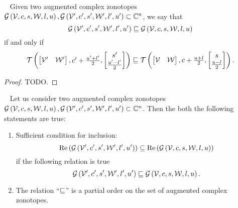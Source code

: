 \begin{definition}~\label{defn:inclusion-acz}
Given two augmented complex zonotopes $\mathcal{G}\left(\mathcal{V},c,s,\mathcal{W},l,u\right),
\mathcal{G}\left(\mathcal{V}^\prime,c^\prime,s^\prime,\mathcal{W}^\prime,l^\prime,u^\prime\right)\subset\mathbb{C}^n$,
we say that
%
\[
\mathcal{G}\left(\mathcal{V}^\prime,c^\prime,s^\prime,\mathcal{W}^\prime,l^\prime,u^\prime\right) \sqsubseteq
 \mathcal{G}\left(\mathcal{V},c,s,\mathcal{W},l,u\right)
\]
%
if and only if
%
\[
\mathit{\operatorname{\mathcal{T}}}\left(\left[\begin{matrix}
      \mathcal{V}^\prime &
      \mathcal{W}^\prime
    \end{matrix}\right]
  ,\begin{matrix}
      c^\prime+\frac{u^\prime+l^\prime}{2}
    \end{matrix}
  ,\left[\begin{matrix}
      s^\prime\\
      \frac{u^\prime-l^\prime}{2}
    \end{matrix}\right]
  \right)  
  \sqsubseteq
  \mathit{\operatorname{\mathcal{T}}}\left(\left[\begin{matrix}
      \mathcal{V} &
      \mathcal{W}
    \end{matrix}\right]
  ,\begin{matrix}
      c+\frac{u+l}{2}
    \end{matrix}
  ,\left[\begin{matrix}
      s\\
      \frac{u-l}{2}
    \end{matrix}\right]
  \right).
\]
%
\end{definition}
%
\begin{proof}
{\color{red} TODO}.
\end{proof}
%
\begin{theorem}~\label{thm:acz-inclusion}
Let us consider two augmented complex zonotopes $\mathcal{G}\left(\mathcal{V},c,s,\mathcal{W},l,u\right),
\mathcal{G}\left(\mathcal{V}^\prime,c^\prime,s^\prime,\mathcal{W}^\prime,l^\prime,u^\prime\right)\subset\mathbb{C}^n$.
Then the both the following statements are true:
\begin{enumerate}
  \item Sufficient condition for inclusion:
%
\[
\operatorname{Re}\left(\mathcal{G}\left(\mathcal{V}^\prime,c^\prime,s^\prime,\mathcal{W}^\prime,l^\prime,u^\prime\right)\right)\subseteq\operatorname{Re}\left(\mathcal{G}\left(\mathcal{V},c,s,\mathcal{W},l,u\right)\right)
\]
%
if the following relation is true
%
\[
\mathcal{G}\left(\mathcal{V}^\prime,c^\prime,s^\prime,\mathcal{W}^\prime,l^\prime,u^\prime\right)\sqsubseteq\mathcal{G}\left(\mathcal{V},c,s,\mathcal{W},l,u\right).
\]
%
\item The relation ``$\sqsubseteq$'' is a partial order on the set of
  augmented complex zonotopes.
\end{enumerate}
%
\end{theorem}
